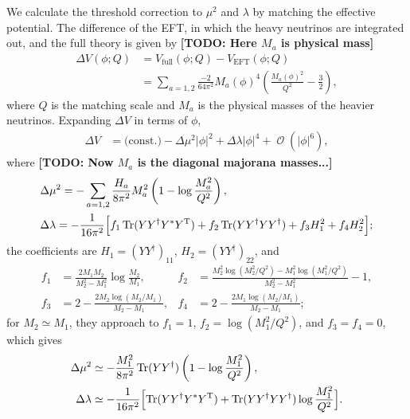 \documentclass[a4paper,11pt]{scrartcl}
\numberwithin{equation}{section}
\newcommand\w[1]{_{\mathrm{#1}}}
\DeclareMathOperator{\Order}{\mathcal{O}}
\DeclareMathOperator{\Tr}{\mathrm{Tr}}
\newcommand{\TODO}[1]{{\textbf{\small \color{red} [TODO: #1]}}}
\newcommand{\trans}{^{\mathrm T}}
\begin{document}
We calculate the threshold correction to $\mu^2$ and $\lambda$ by matching the effective potential.
The difference of the EFT, in which the heavy neutrinos are integrated out, and the full theory is given by
\TODO{Here $M_a$ is physical mass}
\begin{align}
 \Delta V(\phi;Q)
&= V\w{full}(\phi;Q) - V\w{EFT}(\phi;Q)\\
&= \sum_{a=1,2}\frac{-2}{64\pi^2}M_a(\phi)^4\left(\frac{M_a(\phi)^2}{Q^2}-\frac32\right),
\end{align}
where $Q$ is the matching scale and $M_a$ is the physical masses of the heavier neutrinos.
Expanding $\Delta V$ in terms of $\phi$,
\begin{align}
 \Delta V
&= \text{(const.)} - \Delta \mu^2 |\phi|^2 + \Delta \lambda |\phi|^4 + \Order\left(|\phi|^6\right),
\end{align}
where
\TODO{Now $M_a$ is the diagonal majorana masses...}
\begin{align}
 &\Delta\mu^2= -\sum_{a=1,2}\frac{H_a}{8\pi^2}M_a^2\left(1-\log\frac{M_a^2}{Q^2}\right),
\\
 &\Delta\lambda
=
-\frac{1}{16\pi^2}
\Bigl[f_1 \Tr(Y Y^\dagger Y^*Y\trans)
+f_2\Tr(YY^\dagger YY^\dagger)
+f_3H_1^2+f_4H_2^2
\Bigr];
\end{align}
the coefficients are $H_1 = (YY^\dagger)_{11}$, $H_2 = (YY^\dagger)_{22}$, and
\begin{align*}
 f_1&=\frac{2M_1 M_2}{M_2^2-M_1^2}\log\frac{M_2}{M_1},&
 f_2&=\frac{M_2^2\log(M_2^2/Q^2) - M_1^2\log(M_1^2/Q^2)}{M_2^2 - M_1^2} - 1,\\
 f_3 &= 2-\frac{2M_2\log(M_2/M_1)}{M_2-M_1},&
 f_4 &= 2-\frac{2M_1\log(M_2/M_1)}{M_2-M_1};
\end{align*}
for $M_2\simeq M_1$, they approach to $f_1=1$, $f_2=\log({M_1^2}/{Q^2})$, and $f_3=f_4=0$, which gives
\begin{align}
 \Delta \mu^2
&\simeq -\frac{M_1^2}{8\pi^2}\Tr(YY^\dagger)\left(1-\log\frac{M_1^2}{Q^2}\right),\\
 \Delta \lambda
&\simeq
-\frac{1}{16\pi^2}\Bigl[
 \Tr(Y Y^\dagger Y^*Y\trans) + \Tr(YY^\dagger YY^\dagger)\log\frac{M_1^2}{Q^2}
\Bigr].
\end{align}
\end{document}

